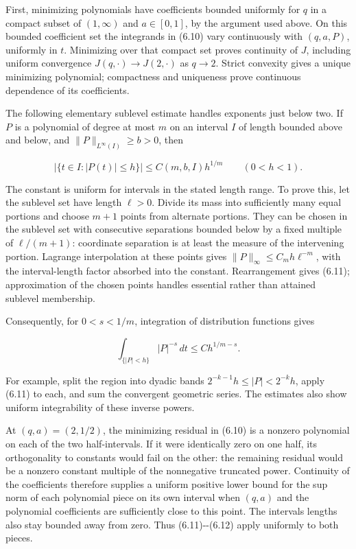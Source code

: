 \documentclass[11pt]{article}
\begin{document}
First, minimizing polynomials have coefficients bounded uniformly for
\(q\) in a compact subset of \((1,\infty)\) and \(a\in[0,1]\), by the
argument used above. On this bounded coefficient set the integrands in
(6.10) vary continuously with \((q,a,P)\), uniformly in \(t\).
Minimizing over that compact set proves continuity of \(J\), including
uniform convergence \(J(q,\cdot)\to J(2,\cdot)\) as \(q\to2\). Strict
convexity gives a unique minimizing polynomial; compactness and
uniqueness prove continuous dependence of its coefficients.

The following elementary sublevel estimate handles exponents just below
two. If \(P\) is a polynomial of degree at most \(m\) on an interval
\(I\) of length bounded above and below, and
\(\|P\|_{L^\infty(I)}\ge b>0\), then

\[
|\{t\in I:|P(t)|\le h\}|\le C(m,b,I)h^{1/m}
\qquad(0<h<1).
\tag{6.11}
\]

The constant is uniform for intervals in the stated length range. To
prove this, let the sublevel set have length \(\ell>0\). Divide its mass
into sufficiently many equal portions and choose \(m+1\) points from
alternate portions. They can be chosen in the sublevel set with
consecutive separations bounded below by a fixed multiple of
\(\ell/(m+1)\): coordinate separation is at least the measure of the
intervening portion. Lagrange interpolation at these points gives
\(\|P\|_\infty\le C_m h\ell^{-m}\), with the interval-length factor
absorbed into the constant. Rearrangement gives (6.11); approximation of
the chosen points handles essential rather than attained sublevel
membership.

Consequently, for \(0<s<1/m\), integration of distribution functions
gives

\[
\int_{\{|P|<h\}}|P|^{-s}\,dt\le C h^{1/m-s}.
\tag{6.12}
\]

For example, split the region into dyadic bands
\(2^{-k-1}h\le|P|<2^{-k}h\), apply (6.11) to each, and sum the
convergent geometric series. The estimates also show uniform
integrability of these inverse powers.

At \((q,a)=(2,1/2)\), the minimizing residual in (6.10) is a nonzero
polynomial on each of the two half-intervals. If it were identically
zero on one half, its orthogonality to constants would fail on the
other: the remaining residual would be a nonzero constant multiple of
the nonnegative truncated power. Continuity of the coefficients
therefore supplies a uniform positive lower bound for the sup norm of
each polynomial piece on its own interval when \((q,a)\) and the
polynomial coefficients are sufficiently close to this point. The
intervals\textquotesingle{} lengths also stay bounded away from zero.
Thus (6.11)-\/-(6.12) apply uniformly to both pieces.
\end{document}

